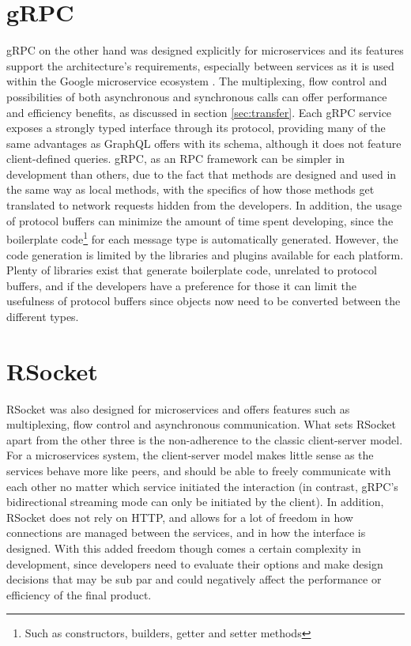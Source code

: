 \section{gRPC}
gRPC on the other hand was designed explicitly for microservices and its features support the architecture's requirements, especially between services as it is used within the Google microservice ecosystem \cite{ryan2015motivation}. The multiplexing, flow control and possibilities of both asynchronous and synchronous calls can offer performance and efficiency benefits, as discussed in section \ref{sec:transfer}. Each gRPC service exposes a strongly typed interface through its protocol, providing many of the same advantages as GraphQL offers with its schema, although it does not feature client-defined queries. gRPC, as an RPC framework can be simpler in development than others, due to the fact that methods are designed and used in the same way as local methods, with the specifics of how those methods get translated to network requests hidden from the developers. In addition, the usage of protocol buffers can minimize the amount of time spent developing, since the boilerplate code\footnote{Such as constructors, builders, getter and setter methods} for each message type is automatically generated. However, the code generation is limited by the libraries and plugins available for each platform. Plenty of libraries exist that generate boilerplate code, unrelated to protocol buffers, and if the developers have a preference for those it can limit the usefulness of protocol buffers since objects now need to be converted between the different types.

\section{RSocket}
RSocket was also designed for microservices and offers features such as multiplexing, flow control and asynchronous communication. What sets RSocket apart from the other three is the non-adherence to the classic client-server model. For a microservices system, the client-server model makes little sense as the services behave more like peers, and should be able to freely communicate with each other no matter which service initiated the interaction (in contrast, gRPC's bidirectional streaming mode can only be initiated by the client). In addition, RSocket does not rely on HTTP, and allows for a lot of freedom in how connections are managed between the services, and in how the interface is designed. With this added freedom though comes a certain complexity in development, since developers need to evaluate their options and make design decisions that may be sub par and could negatively affect the performance or efficiency of the final product.